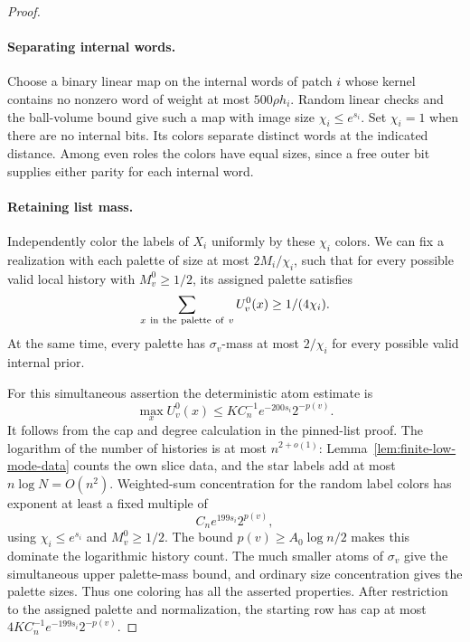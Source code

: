 \begin{proof}\leavevmode\par
\paragraph{Separating internal words.}
Choose a binary linear map on the internal words of patch \(i\) whose
kernel contains no nonzero word of weight at most \(500\rho h_i\).
Random linear checks and the ball-volume bound give such a map with image
size \(\chi_i\le e^{s_i}\). Set \(\chi_i=1\) when there are no internal
bits. Its colors separate distinct words at the indicated distance.
Among even roles the colors have equal sizes, since a free outer bit
supplies either parity for each internal word.

\paragraph{Retaining list mass.}
Independently color the labels of \(X_i\) uniformly by these \(\chi_i\)
colors. We can fix a realization with each palette of size at most
\(2M_i/\chi_i\), such that for every possible valid local history with
\(M_v^0\ge1/2\), its assigned palette satisfies
\[
 \sum_{x\ {\rm in\ the\ palette\ of}\ v}U_v^0(x)
       \ge 1/(4\chi_i).
\]
At the same time, every palette has \(\sigma_v\)-mass at most
\(2/\chi_i\) for every possible valid internal prior.

For this simultaneous assertion the deterministic atom estimate is
\[
 \max_x U_v^0(x)\le K C_n^{-1}e^{-200s_i}2^{-p(v)}.
\]
It follows from the cap and degree calculation in the pinned-list proof.
The logarithm of the number of histories is at most \(n^{2+o(1)}\):
Lemma~\ref{lem:finite-low-mode-data} counts the own slice data, and the
star labels add at most \(n\log N=O(n^2)\). Weighted-sum concentration
for the random label colors has exponent at least a fixed multiple of
\[
 C_n e^{199s_i}2^{p(v)},
\]
using \(\chi_i\le e^{s_i}\) and \(M_v^0\ge1/2\). The bound
\(p(v)\ge A_0\log n/2\) makes this dominate the logarithmic history
count. The much smaller atoms of \(\sigma_v\) give the simultaneous
upper palette-mass bound, and ordinary size concentration gives the
palette sizes. Thus one coloring has all the asserted properties.
After restriction to the assigned palette and normalization, the starting
row has cap at most
\(4K C_n^{-1}e^{-199s_i}2^{-p(v)}\).


\end{proof}
